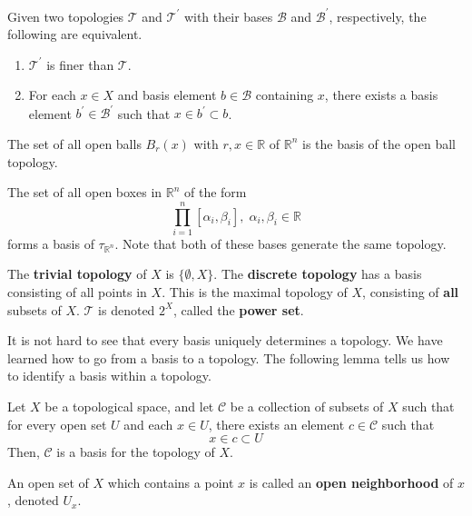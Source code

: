 \documentclass{article}
\begin{document}
    \begin{lemma}
    Given two topologies $\mathscr{T}$ and $\mathscr{T}^\prime$ with their bases $\mathscr{B}$ and $\mathscr{B}^\prime$, respectively, the following are equivalent. 
    \begin{enumerate}
        \item $\mathscr{T}^\prime$ is finer than $\mathscr{T}$. 
        \item For each $x \in X$ and basis element $b \in \mathscr{B}$ containing $x$, there exists a basis element $b^\prime \in \mathscr{B}^\prime$ such that $x \in b^\prime \subset b$. 
    \end{enumerate}
    \end{lemma}

    \begin{example}
    The set of all open balls $B_r (x)$ with $r, x \in \mathbb{R}$ of $\mathbb{R}^n$ is the basis of the open ball topology. 

    The set of all open boxes in $\mathbb{R}^{n}$ of the form 
    \[\prod_{i=1}^n [\alpha_i, \beta_i], \; \alpha_i, \beta_i \in \mathbb{R} \]
    forms a basis of $\tau_{\mathbb{R}^{n}}$. Note that both of these bases generate the same topology. 
    \end{example}

    \begin{definition}
    The \textbf{trivial topology} of $X$ is $\{\emptyset, X\}$. The \textbf{discrete topology} has a basis consisting of all points in $X$. This is the maximal topology of $X$, consisting of \textbf{all} subsets of $X$. $\mathscr{T}$ is denoted $2^{X}$, called the \textbf{power set}.
    \end{definition}

    It is not hard to see that every basis uniquely determines a topology. We have learned how to go from a basis to a topology. The following lemma tells us how to identify a basis within a topology. 

    \begin{lemma}
    Let $X$ be a topological space, and let $\mathcal{C}$ be a collection of subsets of $X$ such that for every open set $U$ and each $x \in U$, there exists an element $c \in \mathcal{C}$ such that
    \[x \in c \subset U\]
    Then, $\mathcal{C}$ is a basis for the topology of $X$. 
    \end{lemma}

    \begin{definition}
    An open set of $X$ which contains a point $x$ is called an \textbf{open neighborhood} of $x$, denoted $U_x$. 
    \end{definition}
\end{document}
